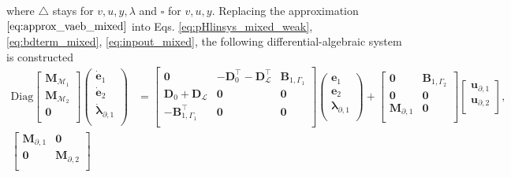 where $\triangle$ stays for $v, u, y, {\lambda}$ and $\square$ for $v, u, y$. Replacing the approximation $\ref{eq:approx_vaeb_mixed}$ into Eqs. \ref{eq:pHlinsys_mixed_weak}, \ref{eq:bdterm_mixed}, \ref{eq:inpout_mixed}, the following differential-algebraic system is constructed
\begin{equation}\label{eq:pHsys_infdim_mult1}
\begin{aligned}
\mathrm{Diag}
\begin{bmatrix}
\mathbf{M}_{\mathcal{M}_1}\\
\mathbf{M}_{\mathcal{M}_2}\\
\mathbf{0}\\
\end{bmatrix}
\begin{pmatrix}
\dot{\mathbf{e}}_{1} \\
\dot{\mathbf{e}}_{2} \\
\dot{\bm{\lambda}}_{\partial, 1} \\
\end{pmatrix}
&= \begin{bmatrix}
\mathbf{0} & -\mathbf{D}_{0}^\top - \mathbf{D}_{\mathcal{L}}^\top & \mathbf{B}_{1, \Gamma_1}\\
\mathbf{D}_{0} + \mathbf{D}_{\mathcal{L}} & \mathbf{0} & \mathbf{0} \\
-\mathbf{B}_{1, \Gamma_1}^\top & \mathbf{0} & \mathbf{0} \\
\end{bmatrix} 
\begin{pmatrix}
\mathbf{e}_{1} \\
\mathbf{e}_{2} \\
{\bm{\lambda}}_{\partial, 1} \\
\end{pmatrix} + 
\begin{bmatrix}
\mathbf{0} & \mathbf{B}_{1, \Gamma_2} \\
\mathbf{0} & \mathbf{0} \\
\mathbf{M}_{\partial, 1} & \mathbf{0} \\
\end{bmatrix}
\begin{bmatrix}
\mathbf{u}_{\partial, 1} \\
\mathbf{u}_{\partial, 2} \\
\end{bmatrix}, \\
\begin{bmatrix}
\mathbf{M}_{\partial, 1} & \mathbf{0} \\
\mathbf{0} & \mathbf{M}_{\partial, 2} \\

\end{bmatrix}
\end{aligned}
\end{equation}
